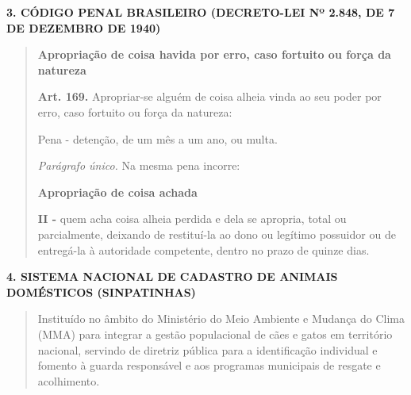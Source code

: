 \vspace{0.5cm}
\noindent
\textbf{3. CÓDIGO PENAL BRASILEIRO (DECRETO-LEI Nº 2.848, DE 7 DE DEZEMBRO DE 1940)}
\vspace{0.2cm}

\begin{quote}
\small
\textbf{Apropriação de coisa havida por erro, caso fortuito ou força da natureza}

\textbf{Art. 169.} Apropriar-se alguém de coisa alheia vinda ao seu poder por erro, caso fortuito ou força da natureza:
\par
Pena - detenção, de um mês a um ano, ou multa.
\par
\textit{Parágrafo único.} Na mesma pena incorre:
\par
\textbf{Apropriação de coisa achada}
\par
\textbf{II -} quem acha coisa alheia perdida e dela se apropria, total ou parcialmente, deixando de restituí-la ao dono ou legítimo possuidor ou de entregá-la à autoridade competente, dentro no prazo de quinze dias.
\end{quote}

\vspace{0.5cm}
\noindent
\textbf{4. SISTEMA NACIONAL DE CADASTRO DE ANIMAIS DOMÉSTICOS (SINPATINHAS)}
\vspace{0.2cm}

\begin{quote}
\small
Instituído no âmbito do Ministério do Meio Ambiente e Mudança do Clima (MMA) para integrar a gestão populacional de cães e gatos em território nacional, servindo de diretriz pública para a identificação individual e fomento à guarda responsável e aos programas municipais de resgate e acolhimento.
\end{quote}

\clearpage
